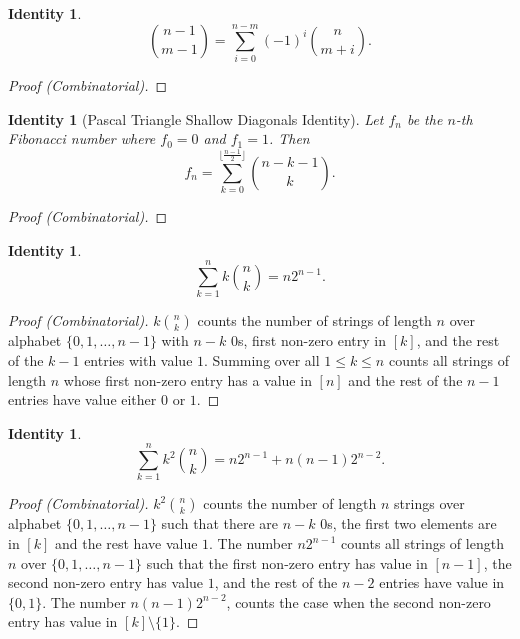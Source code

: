 \documentclass[12]{article}
\newcounter{identityCounter}
\newtheorem{iden}[identityCounter]{Identity}
\theoremstyle{definition}
\begin{document}
	\begin{iden}
		$${n-1 \choose m-1} = \sum_{i=0}^{n-m} (-1)^i {n \choose m+i}.$$
	\end{iden}
	\begin{proof}[Proof (Combinatorial)]
		
	\end{proof}

	
	\begin{iden}[Pascal Triangle Shallow Diagonals Identity]
		Let $f_n$ be the $n$-th Fibonacci number where $f_0 = 0$ and $f_1 = 1$.  Then
		$$f_n = \sum_{k = 0}^{ \big\lfloor\tfrac{n-1}{2} \big\rfloor } { n- k - 1 \choose k}.$$
	\end{iden}
	\begin{proof}[Proof (Combinatorial)]
		
	\end{proof}
	
	\begin{iden}
		$$\sum_{k=1}^n k{n \choose k} = n2^{n-1}.$$
	\end{iden}
	\begin{proof}[Proof (Combinatorial)]
		$k{n \choose k}$ counts the number of strings of length $n$ over alphabet $\{0, 1, \ldots, n-1\}$ with $n-k$ $0$s, first non-zero entry in $[k]$, and the rest of the $k-1$ entries with value $1$.  Summing over all $1 \leq k \leq n$ counts all strings of length $n$ whose first non-zero entry has a value in $[n]$ and the rest of the $n-1$ entries have value either $0$ or $1$.
	\end{proof}
	
	\begin{iden}
		$$\sum_{k=1}^n k^2{n \choose k} = n2^{n-1} + n(n-1)2^{n-2}.$$
	\end{iden}
	\begin{proof}[Proof (Combinatorial)]
		$k^2 { n \choose k}$ counts the number of length $n$ strings over alphabet $\{0, 1, \ldots, n-1\}$ such that there are $n-k$ $0$s, the first two elements are in $[k]$ and the rest have value $1$.  The number $n2^{n-1}$ counts all strings of length $n$ over $\{0, 1, \ldots, n-1\}$ such that the first non-zero entry has value in $[n-1]$, the second non-zero entry has value $1$, and the rest of the $n-2$ entries have value in $\{0,1\}$.  The number $n(n-1)2^{n-2}$, counts the case when the second non-zero entry has value in $[k] \setminus \{1\}$.
	\end{proof}
\end{document}
